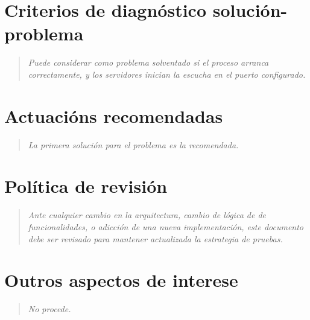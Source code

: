 \documentclass[DIV=calc,paper=a4,fontsize=11pt,onecolumn]{scrartcl}	 %
\newcommand{\hint}[1]{\begin{quote}\itshape #1 \end{quote}}
\begin{document}
\section{Criterios de diagnóstico solución-problema}

\hint{Puede considerar como problema solventado si el proceso arranca correctamente, y los servidores inician la escucha en el puerto configurado.}

\section{Actuacións recomendadas}

\hint{La primera solución para el problema es la recomendada.}

\section{Política de revisión}

\hint{Ante cualquier cambio en la arquitectura, cambio de lógica de de funcionalidades, o adicción de una nueva implementación, este documento debe ser revisado para mantener actualizada la estrategia de pruebas.}

\section{Outros aspectos de interese}

\hint{No procede.}
\end{document}

